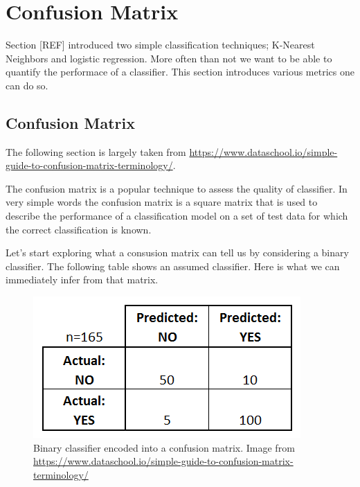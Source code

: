 \section{Confusion Matrix}
\label{confusion_matrix}

Section [REF] introduced two simple classification techniques; K-Nearest Neighbors and logistic regression.
More often than not we want to be able to quantify the performace of a classifier.
This section introduces various metrics one can do so.

\subsection{Confusion Matrix}
\label{confusion_matrix}


\begin{framed}
\begin{acknowledgement}

The following section is largely taken from \url{https://www.dataschool.io/simple-guide-to-confusion-matrix-terminology/}.
\end{acknowledgement}
\end{framed}

The confusion matrix is a popular technique to assess the quality of classifier.
In very simple words the confusion matrix is a square matrix that is used to describe the
performance of a classification model on a set of test data for which the correct classification
is known. 

Let's start exploring what a consusion matrix can tell us by considering a binary classifier.
The following table shows an assumed classifier. Here is what we can immediately infer from that matrix.

\begin{figure}[!htb]
	\begin{center}
		\includegraphics[scale=0.480]{imgs/confusion_matrix_simple2.png}
	\end{center}
	\caption{Binary classifier encoded into a confusion matrix. Image from \url{https://www.dataschool.io/simple-guide-to-confusion-matrix-terminology/}}
	\label{confusion_matrix_simple2. }
\end{figure}



